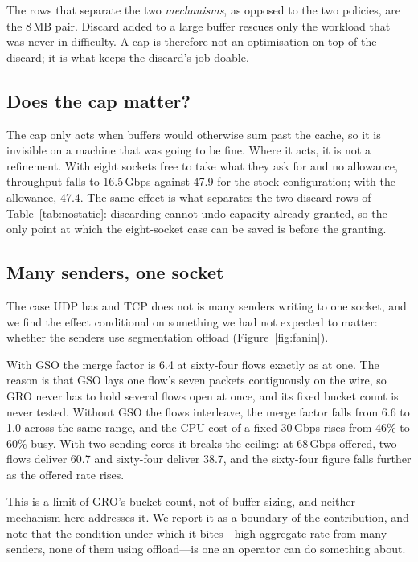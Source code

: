 \documentclass[letterpaper,twocolumn,10pt]{article}
\begin{document}
The rows that separate the two \emph{mechanisms}, as opposed to the two
policies, are the 8\,MB pair. Discard added to a large buffer rescues only the
workload that was never in difficulty. A cap is therefore not an optimisation on
top of the discard; it is what keeps the discard's job doable.

\subsection{Does the cap matter?}

The cap only acts when buffers would otherwise sum past the cache, so it is
invisible on a machine that was going to be fine. Where it acts, it is not a
refinement. With eight sockets free to take what they ask for and no allowance,
throughput falls to 16.5\,Gbps against 47.9 for the stock configuration; with
the allowance, 47.4. The same effect is what separates the two discard rows of
Table~\ref{tab:nostatic}: discarding cannot undo capacity already granted, so
the only point at which the eight-socket case can be saved is before the
granting.

\subsection{Many senders, one socket}

The case UDP has and TCP does not is many senders writing to one socket, and we
find the effect conditional on something we had not expected to matter: whether
the senders use segmentation offload (Figure~\ref{fig:fanin}).

With GSO the merge factor is 6.4 at sixty-four flows exactly as at one. The
reason is that GSO lays one flow's seven packets contiguously on the wire, so
GRO never has to hold several flows open at once, and its fixed bucket count is
never tested. Without GSO the flows interleave, the merge factor falls from 6.6
to 1.0 across the same range, and the CPU cost of a fixed 30\,Gbps rises from
46\% to 60\% busy. With two sending cores it breaks the ceiling: at 68\,Gbps
offered, two flows deliver 60.7 and sixty-four deliver 38.7, and the sixty-four
figure falls further as the offered rate rises.

This is a limit of GRO's bucket count, not of buffer sizing, and neither
mechanism here addresses it. We report it as a boundary of the contribution, and
note that the condition under which it bites---high aggregate rate from many
senders, none of them using offload---is one an operator can do something about.
\end{document}
